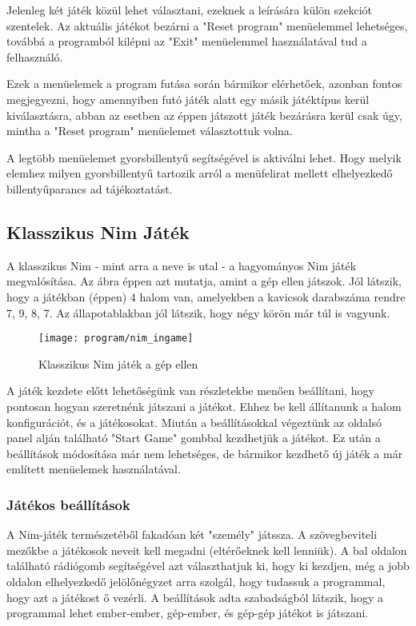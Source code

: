 Jelenleg két játék közül lehet választani, ezeknek a leírására külön szekciót szentelek. Az aktuális játékot bezárni a "Reset program" menüelemmel lehetséges, továbbá a programból kilépni az "Exit" menüelemmel használatával tud a felhasználó.\ujsor

Ezek a menüelemek a program futása során bármikor elérhetőek, azonban fontos megjegyezni, hogy amennyiben futó játék alatt egy másik játéktípus kerül kiválasztásra, abban az esetben az éppen játszott játék bezárásra kerül csak úgy, mintha a "Reset program" menüelemet választottuk volna.\ujsor

A legtöbb menüelemet gyorsbillentyű segítségével is aktiválni lehet. Hogy melyik elemhez milyen gyorsbillentyű tartozik arról a menüfelirat mellett elhelyezkedő billentyűparancs ad tájékoztatást.

\subsection{Klasszikus Nim Játék}
A klasszikus Nim - mint arra a neve is utal - a hagyományos Nim játék megvalósítása. Az  ábra éppen azt mutatja, amint a gép ellen játszok. Jól látszik, hogy a játékban (éppen) 4 halom van, amelyekben a kavicsok darabszáma rendre 7, 9, 8, 7. Az állapotablakban jól látszik, hogy négy körön már túl is vagyunk.
\begin{figure}[h]
	\texttt{[image: program/nim\_ingame]}
	\centering
	\caption{Klasszikus Nim játék a gép ellen}
	\label{fig:nim_ingame}
\end{figure}

A játék kezdete előtt lehetőségünk van részletekbe menően beállítani, hogy pontosan hogyan szeretnénk játszani a játékot. Ehhez be kell állítanunk a halom konfigurációt, és a játékosokat. Miután a beállításokkal végeztünk az oldalsó panel alján található "Start Game" gombbal kezdhetjük a játékot. Ez után a beállítások módosítása már nem lehetséges, de bármikor kezdhető új játék a már említett menüelemek használatával.

\subsubsection{Játékos beállítások}
A Nim-játék természetéből fakadóan két "személy" játssza. A szövegbeviteli mezőkbe a játékosok neveit kell megadni (eltérőeknek kell lenniük). A bal oldalon található rádiógomb segítségével azt választhatjuk ki, hogy ki kezdjen, még a jobb oldalon elhelyezkedő jelölőnégyzet arra szolgál, hogy tudassuk a programmal, hogy azt a játékost ő vezérli.\ujsor
A beállítások adta szabadságból látszik, hogy a programmal lehet ember-ember, gép-ember, és gép-gép játékot is játszani.

